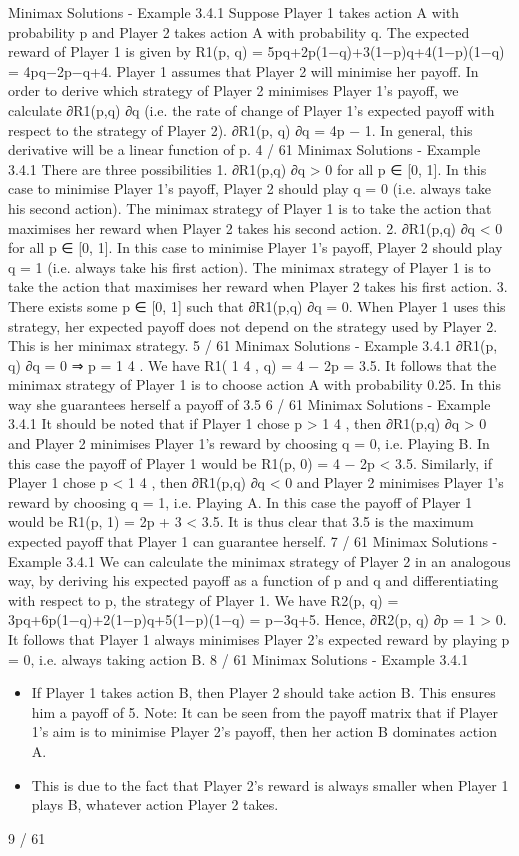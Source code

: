 Minimax Solutions - Example 3.4.1
Suppose Player 1 takes action A with probability p and Player 2
takes action A with probability q. The expected reward of Player 1
is given by
R1(p, q) = 5pq+2p(1−q)+3(1−p)q+4(1−p)(1−q) = 4pq−2p−q+4.
Player 1 assumes that Player 2 will minimise her payoff. In order to
derive which strategy of Player 2 minimises Player 1’s payoff, we
calculate ∂R1(p,q)
∂q
(i.e. the rate of change of Player 1’s expected
payoff with respect to the strategy of Player 2).
∂R1(p, q)
∂q
= 4p − 1.
In general, this derivative will be a linear function of p.
4 / 61
Minimax Solutions - Example 3.4.1
There are three possibilities
1. ∂R1(p,q)
∂q > 0 for all p ∈ [0, 1]. In this case to minimise
Player 1’s payoff, Player 2 should play q = 0 (i.e.
always take his second action). The minimax strategy
of Player 1 is to take the action that maximises her
reward when Player 2 takes his second action.
2. ∂R1(p,q)
∂q < 0 for all p ∈ [0, 1]. In this case to minimise
Player 1’s payoff, Player 2 should play q = 1 (i.e.
always take his first action). The minimax strategy of
Player 1 is to take the action that maximises her
reward when Player 2 takes his first action.
3. There exists some p ∈ [0, 1] such that ∂R1(p,q)
∂q = 0.
When Player 1 uses this strategy, her expected payoff
does not depend on the strategy used by Player 2.
This is her minimax strategy.
5 / 61
Minimax Solutions - Example 3.4.1
∂R1(p, q)
∂q
= 0 ⇒ p =
1
4
.
We have
R1(
1
4
, q) = 4 − 2p = 3.5.
It follows that the minimax strategy of Player 1 is to choose action
A with probability 0.25. In this way she guarantees herself a payoff
of 3.5
6 / 61
Minimax Solutions - Example 3.4.1
It should be noted that if Player 1 chose p >
1
4
, then ∂R1(p,q)
∂q > 0
and Player 2 minimises Player 1’s reward by choosing q = 0, i.e.
Playing B.
In this case the payoff of Player 1 would be
R1(p, 0) = 4 − 2p < 3.5.
Similarly, if Player 1 chose p <
1
4
, then ∂R1(p,q)
∂q < 0 and Player 2
minimises Player 1’s reward by choosing q = 1, i.e. Playing A.
In this case the payoff of Player 1 would be
R1(p, 1) = 2p + 3 < 3.5. It is thus clear that 3.5 is the maximum
expected payoff that Player 1 can guarantee herself.
7 / 61
Minimax Solutions - Example 3.4.1
We can calculate the minimax strategy of Player 2 in an analogous
way, by deriving his expected payoff as a function of p and q and
differentiating with respect to p, the strategy of Player 1. We have
R2(p, q) = 3pq+6p(1−q)+2(1−p)q+5(1−p)(1−q) = p−3q+5.
Hence,
∂R2(p, q)
∂p
= 1 > 0.
It follows that Player 1 always minimises Player 2’s expected
reward by playing p = 0, i.e. always taking action B.
8 / 61
Minimax Solutions - Example 3.4.1
\begin{itemize}
\item If Player 1 takes action B, then Player 2 should take action B.
This ensures him a payoff of 5.
Note: It can be seen from the payoff matrix that if Player 1’s aim
is to minimise Player 2’s payoff, then her action B dominates
action A.
\item This is due to the fact that Player 2’s reward is always smaller
when Player 1 plays B, whatever action Player 2 takes.
\end{itemize}
9 / 61


